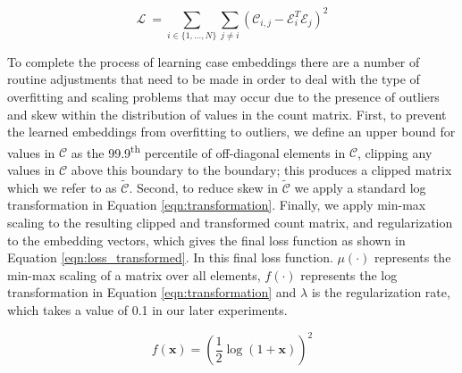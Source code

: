 \documentclass[runningheads]{llncs}
\begin{document}
\begin{equation}\label{eqn:loss}
    \mathcal{L} ~= 
    \sum_{i\in\{1,...,N\}}\sum_{j\neq i} 
    \left(\mathcal{C}_{i,j} - \mathcal{E}_i^T\mathcal{E}_j\right)^2
\end{equation}


To complete the process of learning case embeddings there are a number of routine adjustments that need to be made in order to deal with the type of overfitting and scaling problems that may occur due to the presence of outliers and skew within the distribution of values in the count matrix. First, to prevent the learned embeddings from overfitting to outliers, we define an upper bound for values in $\mathcal{C}$ as the 99.9\textsuperscript{th} percentile of off-diagonal elements in $\mathcal{C}$, clipping any values in $\mathcal{C}$ above this boundary to the boundary; this produces a clipped matrix which we refer to as $\tilde{\mathcal{C}}$. Second, to reduce skew in $\tilde{\mathcal{C}}$ we apply a standard log transformation in Equation \ref{eqn:transformation}. Finally, we apply min-max scaling to the resulting clipped and transformed count matrix, and regularization to the embedding vectors, which gives the final loss function as shown in Equation \ref{eqn:loss_transformed}. In this final loss function. $\mu(\cdot)$ represents the min-max scaling of a matrix over all elements, $f(\cdot)$ represents the log transformation in Equation \ref{eqn:transformation} and $\lambda$ is the regularization rate, which takes a value of 0.1 in our later experiments.


\begin{equation}\label{eqn:transformation}
    f(\mathbf{x}) = \left(\frac{1}{2}\log(1+\mathbf{x})\right)^2
\end{equation}


\end{document}
